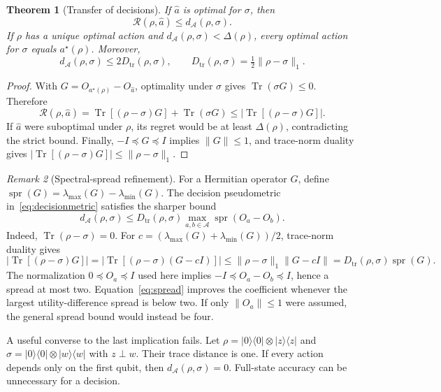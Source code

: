 \documentclass[11pt,a4paper]{article}
\newcommand{\ket}[1]{\lvert #1\rangle}
\newcommand{\bra}[1]{\langle #1\rvert}
\newcommand{\Tr}{\operatorname{Tr}}
\newtheorem{theorem}{Theorem}[section]
\theoremstyle{definition}
\theoremstyle{remark}
\newtheorem{remark}[theorem]{Remark}
\numberwithin{equation}{section}
\begin{document}
\begin{theorem}[Transfer of decisions]\label{thm:decisiontransfer}
If $\widehat a$ is optimal for $\sigma$, then
\begin{equation}
 \mathcal R(\rho,\widehat a)\leq d_{\mathcal A}(\rho,\sigma).
\end{equation}
If $\rho$ has a unique optimal action and
$d_{\mathcal A}(\rho,\sigma)<\Delta(\rho)$, every optimal action for
$\sigma$ equals $a^\star(\rho)$. Moreover,
\begin{equation}
 d_{\mathcal A}(\rho,\sigma)\leq2D_{\mathrm{tr}}(\rho,\sigma),
 \qquad D_{\mathrm{tr}}(\rho,\sigma)=\tfrac12\|\rho-\sigma\|_1.
\end{equation}
\end{theorem}
\begin{proof}
With $G=O_{a^\star(\rho)}-O_{\widehat a}$, optimality under $\sigma$
gives $\Tr(\sigma G)\leq0$. Therefore
\[
 \mathcal R(\rho,\widehat a)
 =\Tr[(\rho-\sigma)G]+\Tr(\sigma G)
 \leq|\Tr[(\rho-\sigma)G]|.
\]
If $\widehat a$ were suboptimal under $\rho$, its regret would be at least
$\Delta(\rho)$, contradicting the strict bound. Finally,
$-I\preceq G\preceq I$ implies $\|G\|\leq1$, and trace-norm duality gives
$|\Tr[(\rho-\sigma)G]|\leq\|\rho-\sigma\|_1$.
\end{proof}

\begin{remark}[Spectral-spread refinement]\label{rem:spread}
For a Hermitian operator $G$, define
$\operatorname{spr}(G)=\lambda_{\max}(G)-\lambda_{\min}(G)$.
The decision pseudometric in~\eqref{eq:decisionmetric} satisfies the sharper bound
\begin{equation}\label{eq:spread}
 d_{\mathcal A}(\rho,\sigma)\leq D_{\mathrm{tr}}(\rho,\sigma)
 \max_{a,b\in\mathcal A}\operatorname{spr}(O_a-O_b).
\end{equation}
Indeed, $\Tr(\rho-\sigma)=0$. For
$c=(\lambda_{\max}(G)+\lambda_{\min}(G))/2$, trace-norm duality gives
\[
 |\Tr[(\rho-\sigma)G]|
 =|\Tr[(\rho-\sigma)(G-cI)]|
 \leq\|\rho-\sigma\|_1\|G-cI\|
 =D_{\mathrm{tr}}(\rho,\sigma)\operatorname{spr}(G).
\]
The normalization $0\preceq O_a\preceq I$ used here implies
$-I\preceq O_a-O_b\preceq I$, hence a spread at most two.
Equation~\eqref{eq:spread} improves the coefficient whenever the largest
utility-difference spread is below two. If only $\|O_a\|\leq1$ were assumed,
the general spread bound would instead be four.
\end{remark}

A useful converse to the last implication fails. Let
$\rho=\ket{0}\bra{0}\otimes\ket{z}\bra{z}$ and
$\sigma=\ket{0}\bra{0}\otimes\ket{w}\bra{w}$ with $z\perp w$.
Their trace distance is one. If every action depends only on the first
qubit, then $d_{\mathcal A}(\rho,\sigma)=0$. Full-state accuracy can be
unnecessary for a decision.
\end{document}
